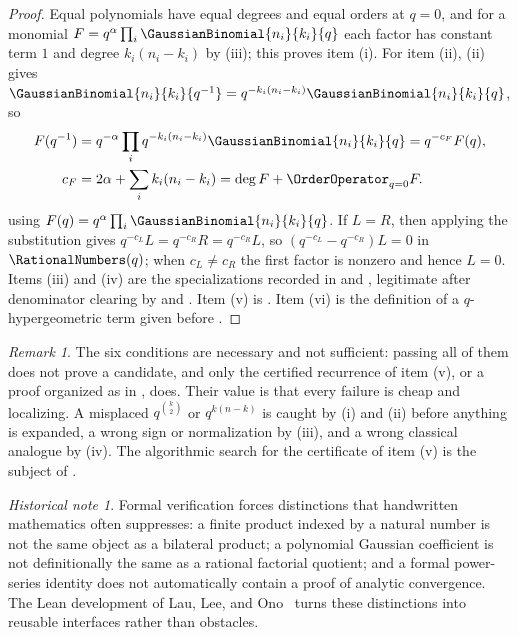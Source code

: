 \documentclass[11pt,a4paper,oneside,openany]{book}
\theoremstyle{definition}
\theoremstyle{remark}
\newtheorem{remark}[remark]{Remark}
\newtheorem{historicalnote}[historicalnote]{Historical note}
\begin{document}
\begin{proof}
Equal polynomials have equal degrees and equal orders at $q=0$, and for a
monomial $F=q^{\alpha}\prod_i\GaussianBinomial{n_i}{k_i}{q}$ each factor has constant term
$1$ and degree $k_i(n_i-k_i)$ by (iii); this proves
item (i).  For item (ii), (ii) gives
$\GaussianBinomial{n_i}{k_i}{q^{-1}}=q^{-k_i(n_i-k_i)}\GaussianBinomial{n_i}{k_i}{q}$, so
\[
 \begin{aligned}
 F(q^{-1})
 &=q^{-\alpha}\prod_i q^{-k_i(n_i-k_i)}\GaussianBinomial{n_i}{k_i}{q}
   =q^{-c_F}F(q),\\
 c_F
 &=2\alpha+\sum_i k_i(n_i-k_i)
   =\deg F+\OrderOperator_{q=0}F.
 \end{aligned}
\]
using $F(q)=q^{\alpha}\prod_i\GaussianBinomial{n_i}{k_i}{q}$.  If $L=R$, then applying the
substitution gives $q^{-c_L}L=q^{-c_R}R=q^{-c_R}L$, so
$(q^{-c_L}-q^{-c_R})L=0$ in $\RationalNumbers(q)$; when $c_L\ne c_R$ the first factor is
nonzero and hence $L=0$.  Items (iii) and (iv) are the specializations
recorded in  and
, legitimate after denominator clearing by
 and .
Item (v) is .  Item (vi) is the definition of
a $q$-hypergeometric term given before .
\end{proof}

\begin{remark}\label{rem:tests-not-sufficient}
The six conditions are necessary and not sufficient: passing all of them does
not prove a candidate, and only the certified recurrence of item (v), or a
proof organized as in , does.  Their value is
that every failure is cheap and localizing.  A misplaced $q^{\binom k2}$ or
$q^{k(n-k)}$ is caught by (i) and (ii) before anything is expanded, a wrong
sign or normalization by (iii), and a wrong classical analogue by (iv).  The
algorithmic search for the certificate of item (v) is the subject of
\cite{PetkovsekWilfZeilberger1996}.
\end{remark}

\begin{historicalnote}
Formal verification forces distinctions that handwritten mathematics often suppresses: a finite product indexed by a natural number is not the same object as a bilateral product; a polynomial Gaussian coefficient is not definitionally the same as a rational factorial quotient; and a formal power-series identity does not automatically contain a proof of analytic convergence.  The Lean development of Lau, Lee, and Ono~\cite{LauLeeOno2026} turns these distinctions into reusable interfaces rather than obstacles.
\end{historicalnote}
\end{document}

